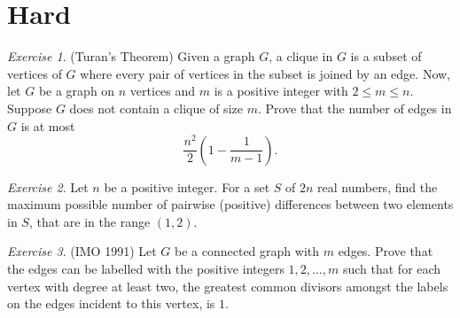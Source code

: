 \documentclass{article}
\theoremstyle{definition}
\theoremstyle{remark}
\newtheorem{exercise}{Exercise}
\begin{document}
\section{Hard}
\begin{exercise}(Turan's Theorem)
Given a graph $G$, a clique in $G$ is a subset of vertices of $G$ where every pair of vertices in the subset is joined by an edge. Now, let $G$ be a graph on $n$ vertices and $m$ is a positive integer with $2 \leq m \leq n$. Suppose $G$ does not contain a clique of size $m$. Prove that the number of edges in $G$ is at most 
\[\frac{n^{2}}{2}(1 - \frac{1}{m - 1}). 
\]
\end{exercise}

\begin{exercise}
Let $n$ be a positive integer. For a set $S$ of $2n$ real numbers, find the maximum possible number of pairwise (positive) differences between two elements in $S$, that are in the range $(1, 2)$.
\end{exercise}

\begin{exercise}(IMO 1991)
Let $G$ be a connected graph with $m$ edges. Prove that the edges can be labelled with the positive integers $1, 2, \ldots, m$ such that for each vertex with degree at least two, the greatest common divisors amongst the labels on the edges incident to this vertex, is $1$.
\end{exercise}
\end{document}
